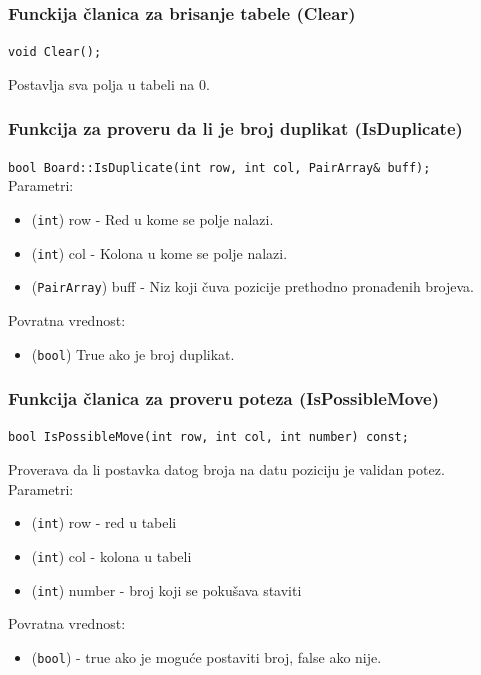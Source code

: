 \documentclass[a4paper]{article}
\begin{document}
    \subsubsection{Funckija članica za brisanje tabele (Clear)}
    \texttt{void Clear();}
    \par Postavlja sva polja u tabeli na 0.

    \subsubsection{Funkcija za proveru da li je broj duplikat (IsDuplicate)}
    \texttt{bool Board::IsDuplicate(int row, int col, PairArray\& buff);}\\
    Parametri:
    \begin{itemize}
        \item (\texttt{int}) row - Red u kome se polje nalazi.
        \item (\texttt{int}) col - Kolona u kome se polje nalazi.
        \item (\texttt{PairArray}) buff - Niz koji čuva pozicije prethodno pronađenih brojeva.
    \end{itemize}
    Povratna vrednost:
    \begin{itemize}
        \item (\texttt{bool}) True ako je broj duplikat.
    \end{itemize}

    \subsubsection{Funkcija članica za proveru poteza (IsPossibleMove)}
    \texttt{bool IsPossibleMove(int row, int col, int number) const;}
    \par Proverava da li postavka datog broja na datu poziciju je validan potez.
    Parametri:
    \begin{itemize}
        \item (\texttt{int}) row - red u tabeli
        \item (\texttt{int}) col - kolona u tabeli
        \item (\texttt{int}) number - broj koji se pokušava staviti
    \end{itemize}
    Povratna vrednost:
    \begin{itemize}
        \item (\texttt{bool}) - true ako je moguće postaviti broj, false ako nije.
    \end{itemize}
\end{document}
